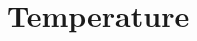\documentclass[a4paper,12pt,%
onecolumn,oneside,%
british%
]{memoir}
\renewcommand*{\|}[1][]{\nonscript\:#1\vert\nonscript\:\mathopen{}}
\begin{document}


\section{Temperature}
\label{sec:temperature}
\end{document}

